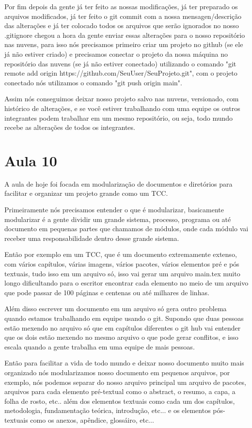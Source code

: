 Por fim depois da gente já ter feito as nossas modificações, já ter preparado os arquivos modificados, já ter feito o git commit com a nossa mensagen/descrição das alterações e já ter colocado todos os arquivos que serão ignorados no nosso .gitignore chegou a hora da gente enviar essas alterações para o nosso repositório nas nuvens, para isso nós precisamos primeiro criar um projeto no github (se ele já não estiver criado) e precisamos conectar o projeto da nossa máquina no repositório das nuvens (se já não estiver conectado) utilizando o comando "git remote add origin https://github.com/SeuUser/SeuProjeto.git", com o projeto conectado nós utilizamos o comando "git push origin main".

Assim nós conseguimos deixar nosso projeto salvo nas nuvens, versionado, com histórico de alterações, e se você estiver trabalhando com uma equipe os outros integrantes podem trabalhar em um mesmo repositório, ou seja, todo mundo recebe as alterações de todos os integrantes.


\section{Aula 10}
A aula de hoje foi focada em modularização de documentos e diretórios para facilitar e organizar um projeto grande como um TCC. 

Primeiramente nós precisamos entender o que é modularizar, basicamente modularizar é a gente dividir um grande sistema, processo, programa ou até documento em pequenas partes que chamamos de módulos, onde cada módulo vai receber uma responsabilidade dentro desse grande sistema.

Então por exemplo em um TCC, que é um documento extremamente extenso, com vários capítulos, várias imagens, vários pacotes, vários elementos pré e pós textuais, tudo isso em um arquivo só, isso vai gerar um arquivo main.tex muito longo dificultando para o escritor encontrar cada elemento no meio de um arquivo que pode passar de 100 páginas e centenas ou até milhares de linhas.

Além disso escrever um documento em um arquivo só gera outro problema quando estamos trabalhando em equipe usando o git. Supondo que duas pessoas estão mexendo no arquivo só que em capítulos diferentes o git hub vai entender que os dois estão mexendo no mesmo arquivo o que pode gerar conflitos, e isso escala quando a gente trabalha em uma equipe de mais pessoas.

Então para facilitar a vida de todo mundo e deixar nosso documento muito mais organizado nós modularizamos nosso documento em pequenos arquivos, por exemplo, nós podemos separar do nosso arquivo principal um arquivo de pacotes, arquivos para cada elemento pré-textual como o abstract, o resumo, a capa, a folha de rosto, etc.. além dos elementos textuais como cada um dos capítulos, metodologia, fundamentação teórica, introdução, etc... e os elementos pós-textuais como os anexos, apêndice, glossáiro, etc...

